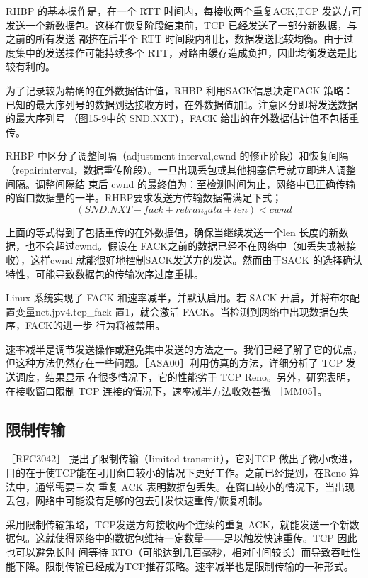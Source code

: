 RHBP 的基本操作是，在一个 RTT 时间内，每接收两个重复ACK,TCP 发送方可发送一个新数据包。这样在恢复阶段结束前，TCP 已经发送了一部分新数据，与之前的所有发送
都挤在后半个 RTT 时间段内相比，数据发送比较均衡。由于过度集中的发送操作可能持续多个 RTT，对路由缓存造成负担，因此均衡发送是比较有利的。

为了记录较为精确的在外数据估计值，RHBP 利用SACK信息决定FACK 策略：已知的最大序列号的数据到达接收方时，在外数据值加1。注意区分即将发送数据的最大序列号
（图15-9中的 SND.NXT），FACK 给出的在外数据估计值不包括重传。

RHBP 中区分了调整间隔（adjustment interval,cwnd 的修正阶段）和恢复间隔（repairinterval，数据重传阶段）。一旦出现丢包或其他拥塞信号就立即进人调整间隔。调整间隔结
束后 cwnd 的最终值为：至检测时间为止，网络中已正确传输的窗口数据量的一半。RHBP要求发送方传输数据需满足下式；
\begin{equation}
    (SND.NXT - fack + retran_ data + len) < cwnd
\end{equation}

上面的等式得到了包括重传的在外数据值，确保当继续发送一个len 长度的新数据，也不会超过cwnd。假设在 FACK之前的数据已经不在网络中（如丢失或被接收），这样cwnd
就能很好地控制SACK发送方的发送。然而由于SACK 的选择确认特性，可能导致数据包的传输次序过度重排。

Linux 系统实现了 FACK 和速率减半，并默认启用。若 SACK 开启，并将布尔配置变量net.jpv4.tcp_fack 置1，就会激活 FACK。当检测到网络中出现数据包失序，FACK的进一步
行为将被禁用。

速率减半是调节发送操作或避免集中发送的方法之一。我们已经了解了它的优点，但这种方法仍然存在一些问题。［ASA00］利用仿真的方法，详细分析了 TCP 发送调度，结果显示
在很多情况下，它的性能劣于 TCP Reno。另外，研究表明，在接收窗口限制 TCP 连接的情况下，速率减半方法收效甚微 ［MM05］。

\subsection{限制传输}
［RFC3042］ 提出了限制传输（Iimited transmit），它对TCP 做出了微小改进，目的在于使TCP能在可用窗口较小的情况下更好工作。之前已经提到，在Reno 算法中，通常需要三次
重复 ACK 表明数据包丢失。在窗口较小的情况下，当出现丢包，网络中可能没有足够的包去引发快速重传/恢复机制。

采用限制传输策略，TCP发送方每接收两个连续的重复 ACK，就能发送一个新数据包。这就使得网络中的数据包维持一定数量——足以触发快速重传。TCP 因此也可以避免长时
间等待 RTO（可能达到几百毫秒，相对时间较长）而导致吞吐性能下降。限制传输已经成为TCP推荐策略。速率减半也是限制传输的一种形式。

